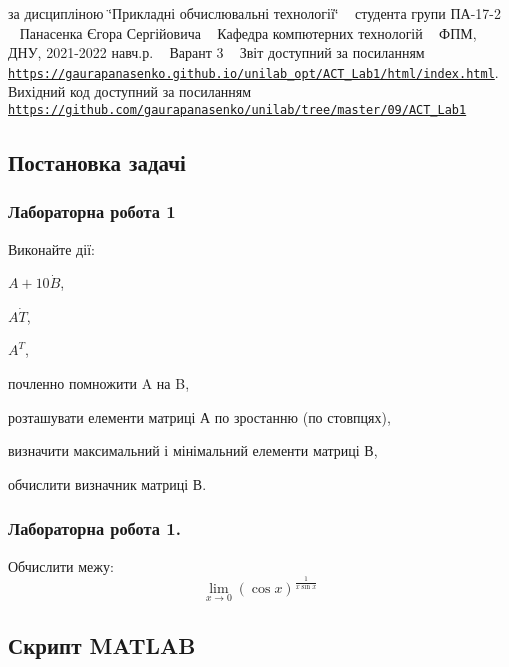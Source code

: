 за дисципліною \char`\"{}Прикладні обчислювальні технології\char`\"{} ~\newline
студента групи ПА-\/17-\/2 ~\newline
Панасенка Єгора Сергійовича ~\newline
Кафедра комп\textquotesingle{}ютерних технологій ~\newline
ФПМ, ДНУ, 2021-\/2022 навч.\+р. ~\newline
Варант 3 ~\newline
 Звіт доступний за посиланням ~\newline
\href{https://gaurapanasenko.github.io/unilab_opt/ACT_Lab1/html/index.html}{\tt https\+://gaurapanasenko.\+github.\+io/unilab\+\_\+opt/\+A\+C\+T\+\_\+\+Lab1/html/index.\+html}. ~\newline
Вихідний код доступний за посиланням ~\newline
\href{https://github.com/gaurapanasenko/unilab/tree/master/09/ACT_Lab1}{\tt https\+://github.\+com/gaurapanasenko/unilab/tree/master/09/\+A\+C\+T\+\_\+\+Lab1}\hypertarget{index_autotoc_md0}{}\subsection{Постановка задачі}\label{index_autotoc_md0}
\hypertarget{index_autotoc_md1}{}\subsubsection{Лабораторна робота 1}\label{index_autotoc_md1}
Виконайте дії\+:
\begin{DoxyItemize}
\item $A+10\dot B$,
\item $A\dot T$,
\item $A^T$,
\item почленно помножити A на B,
\item розташувати елементи матриці А по зростанню (по стовпцях),
\item визначити максимальний і мінімальний елементи матриці В,
\item обчислити визначник матриці В.
\end{DoxyItemize}\hypertarget{index_autotoc_md2}{}\subsubsection{Лабораторна робота 1.}\label{index_autotoc_md2}
Обчислити межу\+: \[\lim_{x\to 0}(\cos{x})^{\frac{1}{x\sin{x}}}\]\hypertarget{index_autotoc_md3}{}\subsection{Скрипт M\+A\+T\+L\+AB}\label{index_autotoc_md3}

